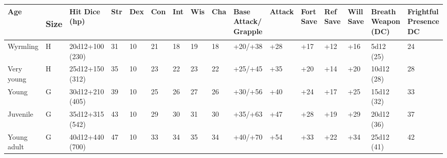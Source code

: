 \documentclass{article}
\begin{document}
\begin{tabular}{|>{\raggedright}p{17pt}|>{\raggedright}p{7pt}|>{\raggedright}p{19pt}|>{\raggedright}p{6pt}|>{\raggedright}p{7pt}|>{\raggedright}p{6pt}|>{\raggedright}p{4pt}|>{\raggedright}p{5pt}|>{\raggedright}p{6pt}|>{\raggedright}p{13pt}|>{\raggedright}p{10pt}|>{\raggedright}p{6pt}|>{\raggedright}p{6pt}|>{\raggedright}p{6pt}|>{\raggedright}p{18pt}|>{\raggedright}p{15pt}|}
\hline
A{\small{}\textbf{ge }} & \subsubsection*{S{\small{}\textbf{ize}}} & H{\small{}\textbf{it 
Dice (hp)}} & S{\small{}\textbf{tr}} & D{\small{}\textbf{ex}} & C{\small{}\textbf{on}} & I{\small{}\textbf{nt}} & W{\small{}\textbf{is}} & C{\small{}\textbf{ha}} & B{\small{}\textbf{ase 
Attack/}}\linebreak{}
{\small{}\textbf{Grapple}} & A{\small{}\textbf{ttack}} & F{\small{}\textbf{ort 
Save}} & R{\small{}\textbf{ef Save}} & W{\small{}\textbf{ill Save}} & B{\small{}\textbf{reath 
Weapon (DC)}} & F{\small{}\textbf{rightful Presence DC}}\tabularnewline
\hline
W{\small{}yrmling } & H & 2{\small{}0d12+100 (230)} & 3{\small{}1} & 1{\small{}0} & 2{\small{}1} & 1{\small{}8} & 1{\small{}9} & 1{\small{}8} & +{\small{}20/+38} & +{\small{}28} & +{\small{}17} & +{\small{}12} & +{\small{}16} & 5{\small{}d12 
(25)} & 2{\small{}4}\tabularnewline
\hline
V{\small{}ery young} & H & 2{\small{}5d12+150 (312)} & 3{\small{}5} & 1{\small{}0} & 2{\small{}3} & 2{\small{}2} & 2{\small{}3} & 2{\small{}2} & +{\small{}25/+45} & +{\small{}35} & +{\small{}20} & +{\small{}14} & +{\small{}20} & 1{\small{}0d12 
(28)} & 2{\small{}8}\tabularnewline
\hline
Y{\small{}oung} & G & 3{\small{}0d12+210 (405)} & 3{\small{}9} & 1{\small{}0} & 2{\small{}5} & 2{\small{}6} & 2{\small{}7} & 2{\small{}6} & +{\small{}30/+56} & +{\small{}40} & +{\small{}24} & +{\small{}17} & +{\small{}25} & 1{\small{}5d12 
(32)} & 3{\small{}3}\tabularnewline
\hline
J{\small{}uvenile} & G & 3{\small{}5d12+315 (542)} & 4{\small{}3} & 1{\small{}0} & 2{\small{}9} & 3{\small{}0} & 3{\small{}1} & 3{\small{}0} & +{\small{}35/+63} & +{\small{}47} & +{\small{}28} & +{\small{}19} & +{\small{}29} & 2{\small{}0d12 
(36)} & 3{\small{}7}\tabularnewline
\hline
Y{\small{}oung adult} & G & 4{\small{}0d12+440 (700)} & 4{\small{}7} & 1{\small{}0} & 3{\small{}3} & 3{\small{}4} & 3{\small{}5} & 3{\small{}4} & +{\small{}40/+70} & +{\small{}54} & +{\small{}33} & +{\small{}22} & +{\small{}34} & 2{\small{}5d12 
(41)} & 4{\small{}2}\tabularnewline

\end{tabular}
\end{document}
